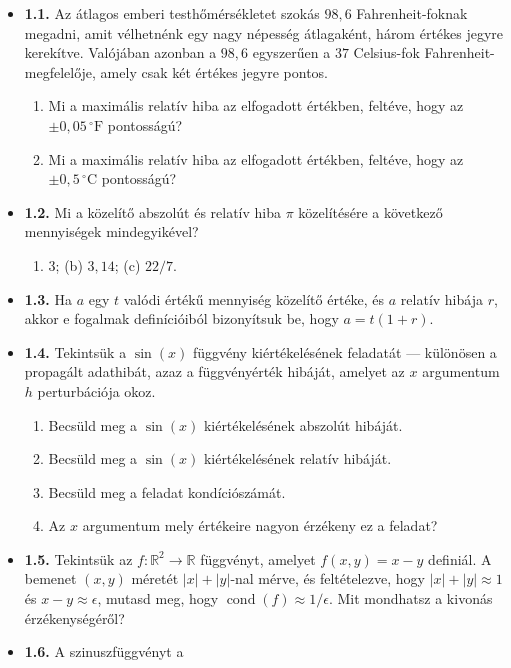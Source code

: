 \documentclass[
  magyar,
  11pt]{article}
\providecommand{\tightlist}{%
  \setlength{\itemsep}{0pt}\setlength{\parskip}{0pt}}
\begin{document}
\begin{itemize}
\tightlist
\item
  \textbf{1.1.} Az átlagos emberi testhőmérsékletet szokás \(98{,}6\)
  Fahrenheit-foknak megadni, amit vélhetnénk egy nagy népesség
  átlagaként, három értékes jegyre kerekítve. Valójában azonban a
  \(98{,}6\) egyszerűen a \(37\) Celsius-fok Fahrenheit-megfelelője,
  amely csak két értékes jegyre pontos.

  \begin{enumerate}
  \def\labelenumi{(\alph{enumi})}
  \tightlist
  \item
    Mi a maximális relatív hiba az elfogadott értékben, feltéve, hogy az
    \(\pm 0{,}05\,^\circ\text{F}\) pontosságú?
  \item
    Mi a maximális relatív hiba az elfogadott értékben, feltéve, hogy az
    \(\pm 0{,}5\,^\circ\text{C}\) pontosságú?
  \end{enumerate}
\item
  \textbf{1.2.} Mi a közelítő abszolút és relatív hiba \(\pi\)
  közelítésére a következő mennyiségek mindegyikével?

  \begin{enumerate}
  \def\labelenumi{(\alph{enumi})}
  \tightlist
  \item
    \(3\); (b) \(3{,}14\); (c) \(22/7\).
  \end{enumerate}
\item
  \textbf{1.3.} Ha \(a\) egy \(t\) valódi értékű mennyiség közelítő
  értéke, és \(a\) relatív hibája \(r\), akkor e fogalmak definícióiból
  bizonyítsuk be, hogy \(a = t(1 + r)\).
\item
  \textbf{1.4.} Tekintsük a \(\sin(x)\) függvény kiértékelésének
  feladatát --- különösen a propagált adathibát, azaz a függvényérték
  hibáját, amelyet az \(x\) argumentum \(h\) perturbációja okoz.

  \begin{enumerate}
  \def\labelenumi{(\alph{enumi})}
  \tightlist
  \item
    Becsüld meg a \(\sin(x)\) kiértékelésének abszolút hibáját.
  \item
    Becsüld meg a \(\sin(x)\) kiértékelésének relatív hibáját.
  \item
    Becsüld meg a feladat kondíciószámát.
  \item
    Az \(x\) argumentum mely értékeire nagyon érzékeny ez a feladat?
  \end{enumerate}
\item
  \textbf{1.5.} Tekintsük az \(f: \mathbb{R}^2 \to \mathbb{R}\)
  függvényt, amelyet \(f(x, y) = x - y\) definiál. A bemenet \((x, y)\)
  méretét \(|x| + |y|\)-nal mérve, és feltételezve, hogy
  \(|x| + |y| \approx 1\) és \(x - y \approx \epsilon\), mutasd meg,
  hogy \(\operatorname{cond}(f) \approx 1/\epsilon\). Mit mondhatsz a
  kivonás érzékenységéről?
\item
  \textbf{1.6.} A szinuszfüggvényt a
\end{itemize}
\end{document}
